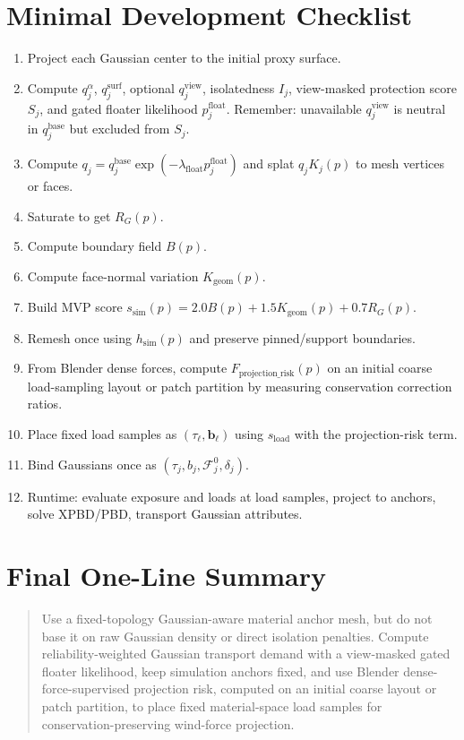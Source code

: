 \documentclass[11pt,a4paper]{article}
\begin{document}
\section{Minimal Development Checklist}

\begin{enumerate}[leftmargin=2em]
\item Project each Gaussian center to the initial proxy surface.
\item Compute $q_j^\alpha$, $q_j^{\mathrm{surf}}$, optional $q_j^{\mathrm{view}}$, isolatedness $I_j$, view-masked protection score $S_j$, and gated floater likelihood $p_j^{\mathrm{float}}$. Remember: unavailable $q_j^{\mathrm{view}}$ is neutral in $q_j^{\mathrm{base}}$ but excluded from $S_j$.
\item Compute $q_j=q_j^{\mathrm{base}}\exp(-\lambda_{\mathrm{float}}p_j^{\mathrm{float}})$ and splat $q_jK_j(p)$ to mesh vertices or faces.
\item Saturate to get $R_G(p)$.
\item Compute boundary field $B(p)$.
\item Compute face-normal variation $K_{\mathrm{geom}}(p)$.
\item Build MVP score $s_{\mathrm{sim}}(p)=2.0B(p)+1.5K_{\mathrm{geom}}(p)+0.7R_G(p)$.
\item Remesh once using $h_{\mathrm{sim}}(p)$ and preserve pinned/support boundaries.
\item From Blender dense forces, compute $F_{\mathrm{projection\_risk}}(p)$ on an initial coarse load-sampling layout or patch partition by measuring conservation correction ratios.
\item Place fixed load samples as $(\tau_\ell,\mathbf{b}_\ell)$ using $s_{\mathrm{load}}$ with the projection-risk term.
\item Bind Gaussians once as $(\tau_j,b_j,\mathcal{F}_j^0,\delta_j)$.
\item Runtime: evaluate exposure and loads at load samples, project to anchors, solve XPBD/PBD, transport Gaussian attributes.
\end{enumerate}

\section{Final One-Line Summary}

\begin{quote}
Use a fixed-topology Gaussian-aware material anchor mesh, but do not base it on raw Gaussian density or direct isolation penalties. Compute reliability-weighted Gaussian transport demand with a view-masked gated floater likelihood, keep simulation anchors fixed, and use Blender dense-force-supervised projection risk, computed on an initial coarse layout or patch partition, to place fixed material-space load samples for conservation-preserving wind-force projection.
\end{quote}
\end{document}
